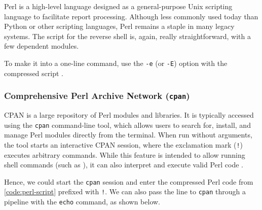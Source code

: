 
Perl is a high-level language designed as a general-purpose Unix scripting language to facilitate report processing. Although less commonly used today than Python or other scripting languages, Perl remains a staple in many legacy systems. The script for the reverse shell is, again, really straightforward, with a few dependent modules.



To make it into a one-line command, use the \texttt{-e} (or \texttt{-E}) option with the compressed script \cite{perl-man}.


\subsubsection{Comprehensive Perl Archive Network (\texttt{cpan})}
\label{sec:cpan}


CPAN is a large repository of Perl modules and libraries. It is typically accessed using the \texttt{cpan} command-line tool, which allows users to search for, install, and manage Perl modules directly from the terminal. When run without arguments, the tool starts an interactive CPAN session, where the exclamation mark (\texttt{!}) executes arbitrary commands. While this feature is intended to allow running shell commands (such as ), it can also interpret and execute valid Perl code \cite{cpan-man}.

Hence, we could start the \texttt{cpan} session and enter the compressed Perl code from \cref{code:perl-script} prefixed with \texttt{!}. We can also pass the line to \texttt{cpan} through a pipeline with the \texttt{echo} command, as shown below.



